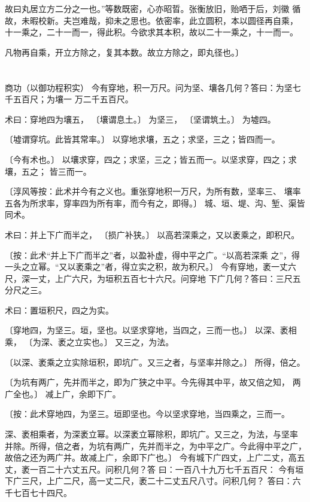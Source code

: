 \documentclass[a4paper,12pt,UTF8,twoside]{ctexbook}
\begin{document}
故曰丸居立方二分之一也。”等数既密，心亦昭晢。张衡放旧，贻哂于后，刘徽 循故，未暇校新。夫岂难哉，抑未之思也。依密率，此立圆积，本以圆径再自乘， 十一乘之，二十一而一，得此积。今欲求其本积，故以二十一乘之，十一而一。

凡物再自乘，开立方除之，复其本数。故立方除之，即丸径也。〕

\chapter{}
商功（以御功程积实） 今有穿地，积一万尺。问为坚、壤各几何？答曰：为坚七千五百尺；为壤一 万二千五百尺。

术曰：穿地四为壤五， 〔壤谓息土。〕 为坚三， 〔坚谓筑土。〕 为墟四。

〔墟谓穿坑。此皆其常率。〕 以穿地求壤，五之；求坚，三之；皆四而一。

〔今有术也。〕 以壤求穿，四之；求坚，三之；皆五而一。以坚求穿，四之；求壤，五之； 皆三而一。

〔淳风等按：此术并今有之义也。重张穿地积一万尺，为所有数，坚率三、 壤率五各为所求率，穿率四为所有率，而今有之，即得。〕 城、垣、堤、沟、堑、渠皆同术。

术曰：并上下广而半之， 〔损广补狭。〕 以高若深乘之，又以袤乘之，即积尺。

〔按：此术“并上下广而半之”者，以盈补虚，得中平之广。“以高若深乘 之”，得一头之立幂。“又以袤乘之”者，得立实之积，故为积尺。〕 今有穿地，袤一丈六尺，深一丈，上广六尺，为垣积五百七十六尺。问穿地 下广几何？答曰：三尺五分尺之三。

术曰：置垣积尺，四之为实。

〔穿地四，为坚三。垣，坚也。以坚求穿地，当四之，三而一也。〕 以深、袤相乘， 〔为深、袤之立实也。〕 又三之，为法。

〔以深、袤乘之立实除垣积，即坑广。又三之者，与坚率并除之。〕 所得，倍之。

〔为坑有两广，先并而半之，即为广狭之中平。今先得其中平，故又倍之知， 两广全也。〕 减上广，余即下广。

〔按：此术穿地四，为坚三。垣即坚也。今以坚求穿地，当四乘之，三而一。

深、袤相乘者，为深袤立幂。以深袤立幂除积，即坑广。又三之，为法，与坚率 并除。所得，倍之者，为坑有两广，先并而半之，为中平之广。今此得中平之广， 故倍之还为两广并。故减上广，余即下广也。〕 今有城下广四丈，上广二丈，高五丈，袤一百二十六丈五尺。问积几何？答 曰：一百八十九万七千五百尺： 今有垣下广三尺，上广二尺，高一丈二尺，袤二十二丈五尺八寸。问积几何？ 答曰：六千七百七十四尺。
\end{document}
